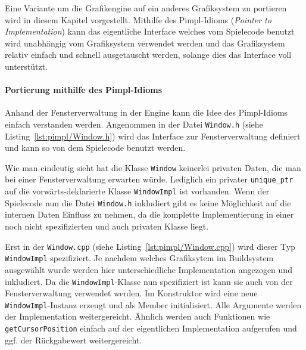 \documentclass[12pt, a4paper, titlepage, hidelinks]{scrreprt}
\begin{document}

Eine Variante um die Grafikengine auf ein anderes Grafiksystem zu portieren wird in diesem Kapitel vorgestellt. Mithilfe des Pimpl-Idioms (\textit{Pointer to Implementation}) kann das eigentliche Interface welches vom Spielecode benutzt wird unabhängig vom Grafiksystem verwendet werden und das Grafiksystem relativ einfach und schnell ausgetauscht werden, solange dies das Interface voll unterstützt. 

\paragraph{Portierung mithilfe des Pimpl-Idioms}
Anhand der Fensterverwaltung in der Engine kann die Idee des Pimpl-Idioms einfach verstanden werden. Angenommen in der Datei \texttt{Window.h} (siehe Listing~\autoref{lst:pimpl/Window.h}) wird das Interface zur Fensterverwaltung definiert und kann so von dem Spielecode benutzt werden.


Wie man eindeutig sieht hat die Klasse \texttt{Window} keinerlei privaten Daten, die man bei einer Fensterverwaltung erwarten würde. Lediglich ein privater \texttt{unique\_ptr} auf die vorwärts-deklarierte Klasse \texttt{WindowImpl} ist vorhanden. Wenn der Spielecode nun die Datei \texttt{Window.h} inkludiert gibt es keine Möglichkeit auf die internen Daten Einfluss zu nehmen, da die komplette Implementierung in einer noch nicht spezifizierten und auch privaten Klasse liegt.

Erst in der \texttt{Window.cpp} (siehe Listing~\autoref{lst:pimpl/Window.cpp}) wird dieser Typ \texttt{WindowImpl} spezifiziert. Je nachdem welches Grafiksytem im Buildsystem ausgewählt wurde werden hier unterschiedliche Implementation angezogen und inkludiert. Da die \texttt{WindowImpl}-Klasse nun spezifiziert ist kann sie auch von der Fensterverwaltung verwendet werden. Im Konstruktor wird eine neue \texttt{WindowImpl}-Instanz erzeugt und als Member initialisiert. Alle Argumente werden der Implementation weitergereicht. Ähnlich werden auch Funktionen wie \texttt{getCursorPosition} einfach auf der eigentlichen Implementation aufgerufen und ggf. der Rückgabewert weitergereicht.
\end{document}
